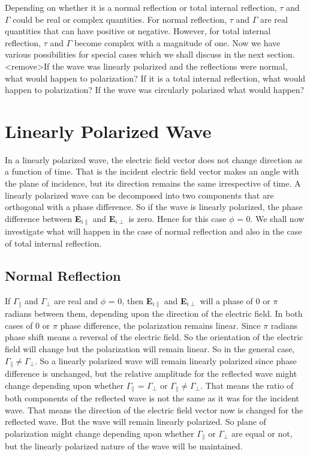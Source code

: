 Depending on whether it is a normal reflection or total internal reflection, $\tau$ and $\Gamma$ could be real or complex quantities. For normal reflection, $\tau$ and $\Gamma$ are real quantities that can have positive or negative. However, for total internal reflection, $\tau$ and $\Gamma$ become complex with a magnitude of one. Now we have various possibilities for special cases which we shall discuss in the next section. <remove>If the wave was linearly polarized and the reflections were normal, what would happen to polarization? If it is a total internal reflection, what would happen to polarization? If the wave was circularly polarized what would happen?

\section{Linearly Polarized Wave}
In a linearly polarized wave, the electric field vector does not change direction as a function of time. That is the incident electric field vector makes an angle with the plane of incidence, but its direction remains the same irrespective of time. A linearly polarized wave can be decomposed into two components that are orthogonal with a phase difference. So if the wave is linearly polarized, the phase difference between \textbf{E}$_{i\parallel}$ and \textbf{E}$_{i\perp}$ is zero. Hence for this case $\phi$ = 0. We shall now investigate what will happen in the case of normal reflection and also in the case of total internal reflection.

\subsection{Normal Reflection}
If $\Gamma_\parallel$ and $\Gamma_\perp$ are real and $\phi$ = 0, then \textbf{E}$_{i\parallel}$ and \textbf{E}$_{i\perp}$ will a phase of 0 or $\pi$ radians between them, depending upon the direction of the electric field. In both cases of 0 or $\pi$ phase difference, the polarization remains linear. Since $\pi$ radians phase shift means a reversal of the electric field. So the orientation of the electric field will change but the polarization will remain linear. So in the general case, $\Gamma_\parallel \neq \Gamma_\perp$. So a linearly polarized wave will remain linearly polarized since phase difference is unchanged, but the relative amplitude for the reflected wave might change depending upon whether $\Gamma_\parallel$ = $\Gamma_\perp$ or $\Gamma_\parallel \neq \Gamma_\perp$. That means the ratio of both components of the reflected wave is not the same as it was for the incident wave. That means the direction of the electric field vector now is changed for the reflected wave. But the wave will remain linearly polarized. So plane of polarization might change depending upon whether $\Gamma_\parallel$ or $\Gamma_\perp$ are equal or not, but the linearly polarized nature of the wave will be maintained.

